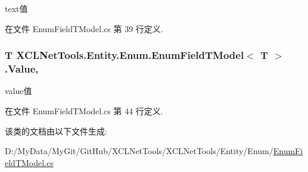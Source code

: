 text值 



在文件 Enum\-Field\-T\-Model.\-cs 第 39 行定义.

\hypertarget{class_x_c_l_net_tools_1_1_entity_1_1_enum_1_1_enum_field_t_model_3_01_t_01_4_a0b6e9efa5eb3b809fdc2bbb675a4e8e3}{
\subsubsection[{Value}]{\setlength{\rightskip}{0pt plus 5cm}T X\-C\-L\-Net\-Tools.\-Entity.\-Enum.\-Enum\-Field\-T\-Model$<$ T $>$.Value\hspace{0.3cm}{\ttfamily [get]}, {\ttfamily [set]}}}\label{class_x_c_l_net_tools_1_1_entity_1_1_enum_1_1_enum_field_t_model_3_01_t_01_4_a0b6e9efa5eb3b809fdc2bbb675a4e8e3}


value值 



在文件 Enum\-Field\-T\-Model.\-cs 第 44 行定义.



该类的文档由以下文件生成\-:\begin{DoxyCompactItemize}
\item 
D\-:/\-My\-Data/\-My\-Git/\-Git\-Hub/\-X\-C\-L\-Net\-Tools/\-X\-C\-L\-Net\-Tools/\-Entity/\-Enum/\hyperlink{_enum_field_t_model_8cs}{Enum\-Field\-T\-Model.\-cs}\end{DoxyCompactItemize}
